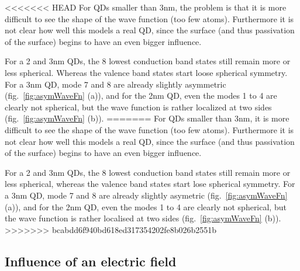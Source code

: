 <<<<<<< HEAD
For QDs smaller than 3nm, the problem is that it is more difficult to see the shape of the wave function (too few atoms). Furthermore it is not clear how well this models a real QD, since the surface (and thus passivation of the surface) begins to have an even bigger influence.
	
For a 2 and 3nm QDs, the 8 lowest conduction band states still remain more or less spherical. Whereas the valence band states start loose spherical symmetry. For a 3nm QD, mode 7 and 8 are already slightly asymmetric (fig.~\ref{fig:asymWaveFn} (a)), and for the 2nm QD, even the modes 1 to 4 are clearly not spherical, but the wave function is rather localized at two sides (fig.~\ref{fig:asymWaveFn} (b)).
=======
For QDs smaller than 3nm, it is more difficult to see the shape of the wave function (too few atoms). Furthermore it is not clear how well this models a real QD, since the surface (and thus passivation of the surface) begins to have an even bigger influence.
	
For a 2 and 3nm QDs, the 8 lowest conduction band states still remain more or less spherical, whereas the valence band states start lose spherical symmetry. For a 3nm QD, mode 7 and 8 are already slightly asymetric (fig.~\ref{fig:asymWaveFn} (a)), and for the 2nm QD, even the modes 1 to 4 are clearly not spherical, but the wave function is rather localised at two sides (fig.~\ref{fig:asymWaveFn} (b)).
>>>>>>> bcabdd6f940bd618ed317354202fe8b026b2551b
	
\FloatBarrier
\subsection{Influence of an electric field}

